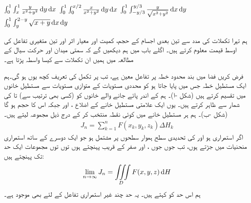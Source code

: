 $\int_0^1\int_x^1\frac{y}{x^2+y^2}\dif y\dif x$
$\int_{0}^{1}\int_{0}^{x/2}\frac{x}{x^2+y^2}\dif y\dif x$
$\int_{0}^{1}\int_{-y/3}^{y/3}\frac{y}{\sqrt{x^2+y^2}}\dif x\dif y$
$\int_{0}^{1}\int_{y}^{2-y}\sqrt{x+y}\dif x\dif y$


ہم تہرا تکملات کی مدد سے تین بعدی اجسام کے حجم، کمیت اور معیار اثر  اور تین متغیری تفاعل کی اوسط قیمت معلوم کرتے ہیں۔ اگلے باب میں ہم دیکھیں گے کہ سمتی میدان   اور  حرکت سیال  کے مطالعہ میں ہمیں ان تکملات سے کیسا واسطہ پڑتا ہے۔

فرض کریں فضا میں بند محدود   خطہ   پر تفاعل  معین ہے، تب  پر تکمل   کی تعریف کچھ یوں ہو گی۔ہم ایک مستطیل خطہ  جس میں  پایا جاتا ہو کو محددی مستویات کے متوازی  مستویات  سے مستطیل خانوں میں تقسیم کرتے ہیں (شکل -ا)۔ ہم  کے اندر پائے جانے والے  خانوں کو  (کسی بھی ترتیب سے)  تا  کی  شمار سے ظاہر  کرتے ہیں۔   یوں ایک علامتی مستطیل خانے کے اضلاع ،  اور  جبکہ اس کا حجم  ہو گا (شکل -ب)۔ ہم ہر مستطیل خانے میں کوئی نقطہ  منتخب کر کے درج ذیل مجموعہ  لیتے  ہیں۔
\begin{align}\label{مساوات_بالکثرت_تہرا_مجموعہ_الف}
J_n=\sum_{k=1}^{n} F(x_k,y_k,z_k)\Delta H_k
\end{align}
اگر  استمراری ہو اور  کی تحدیدی سطح ہموار سطحوں پر مشتمل ہو جو ایک دوسرے کے ساتھ استمراری منحنیات میں جڑتے ہوں، تب جوں جوں ،  اور  صفر کے قریب پہنچتے ہوں  توں توں  مجموعات    ایک حد تک پہنچتے ہیں:
\begin{align}
\lim_{n\to \infty}J_n=\iiint\limits_D F(x,y,z)\dif H
\end{align} 
ہم اس حد کو کہتے ہیں۔ یہ حد چند غیر استمراری تفاعل کے لئے بھی موجود ہے۔
